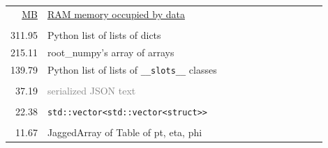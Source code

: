\documentclass{webofc}
\begin{document}
\begin{table}[b]
\begin{minipage}{0.4\linewidth}\scriptsize
\begin{tabular}{r p{0.9\linewidth}}
\underline{MB} & \underline{RAM memory occupied by data} \\
& \\
311.95 & \textcolor{pythoncolor}{Python list of lists of dicts} \\
215.11 & \textcolor{rootnpcolor}{root\_numpy's array of arrays} \\
139.79 & \textcolor{pythoncolor}{Python list of lists of {\tt \_\_slots\_\_} classes} \\
& \\
 37.19 & \textcolor{gray}{serialized JSON text} \\
& \\
 22.38 & \textcolor{cppcolor}{{\tt\scriptsize std::vector<std::vector<struct>>}} \\
& \\
 11.67 & \textcolor{mycolor}{JaggedArray of Table of pt, eta, phi} \\
\end{tabular}


\end{minipage}
\end{table}
\end{document}
